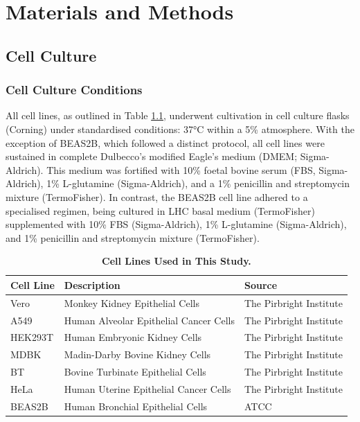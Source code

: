 \chapter{Materials and Methods} \label{ch:Materials and Methods}
\section{Cell Culture} \label{sec:Cell Culture}
\subsection{Cell Culture Conditions} \label{subsec:Cell Culture Conditions}
All cell lines, as outlined in Table \ref{tab:Cell Lines Table}, underwent cultivation in cell culture flasks (Corning) under standardised conditions: 37°C within a 5\%  atmosphere. With the exception of BEAS2B, which followed a distinct protocol, all cell lines were sustained in complete Dulbecco’s modified Eagle's medium (DMEM; Sigma-Aldrich). This medium was fortified with 10\% foetal bovine serum (FBS, Sigma-Aldrich), 1\% L-glutamine (Sigma-Aldrich), and a 1\% penicillin and streptomycin mixture (TermoFisher). In contrast, the BEAS2B cell line adhered to a specialised regimen, being cultured in LHC basal medium (TermoFisher) supplemented with 10\% FBS (Sigma-Aldrich), 1\% L-glutamine (Sigma-Aldrich), and 1\% penicillin and streptomycin mixture (TermoFisher).

\begin{table}
  \centering
  \begin{tabular}{lll}
    \toprule
    {\textbf{Cell Line}} &
  {\textbf{Description}} &
  {\textbf{Source}} \\ \midrule
    Vero & Monkey Kidney Epithelial Cells & The Pirbright Institute \\ 
    A549 & Human Alveolar Epithelial Cancer Cells &  The Pirbright Institute \\
    HEK293T & Human Embryonic Kidney Cells & The Pirbright Institute \\ 
    MDBK & Madin-Darby Bovine Kidney Cells & The Pirbright Institute \\
    BT & Bovine Turbinate Epithelial Cells & The Pirbright Institute \\
    HeLa & Human Uterine Epithelial Cancer Cells & The Pirbright Institute \\
    BEAS2B & Human Bronchial Epithelial Cells & ATCC  \\ \bottomrule
  \end{tabular}
  \caption[Cell Lines Used in This Study.]{\textbf{Cell Lines Used in This Study.}}
  \label{tab:Cell Lines Table}
\end{table}

